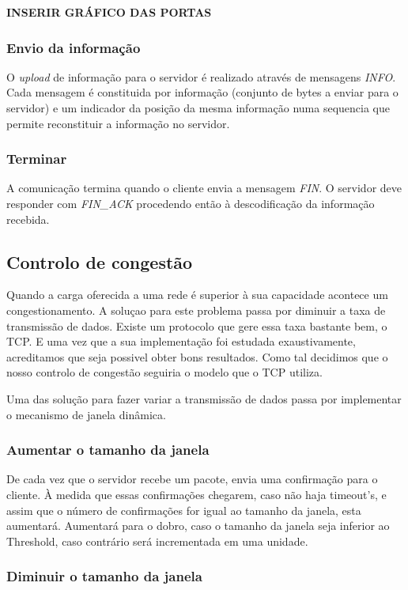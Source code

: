 \documentclass{llncs}
\begin{document}
\textbf{INSERIR GRÁFICO DAS PORTAS}


\subsubsection{Envio da informação}
O \textit{upload} de informação para o servidor é realizado através de mensagens \textit{INFO}. Cada mensagem é constituida por informação (conjunto de bytes a enviar para o servidor) e um indicador da posição da mesma informação numa sequencia que permite reconstituir a informação no servidor.

\subsubsection{Terminar}
A comunicação termina quando o cliente envia a mensagem \textit{FIN}. O servidor deve responder com \textit{FIN\_ACK} procedendo então à descodificação da informação recebida.

\subsection{Controlo de congestão}

Quando a carga oferecida a uma rede é superior à sua capacidade acontece um congestionamento. A soluçao para este problema passa por diminuir a taxa de transmissão de dados.
Existe um protocolo que gere essa taxa bastante bem, o TCP. E uma vez que a sua implementação foi estudada exaustivamente, acreditamos que seja possivel obter bons resultados. Como tal decidimos que o nosso controlo de congestão seguiria o modelo que o TCP utiliza.

Uma das solução para fazer variar a transmissão de dados passa por implementar o mecanismo de janela dinâmica.

\subsubsection{Aumentar o tamanho da janela}

De cada vez que o servidor recebe um pacote, envia uma confirmação para o cliente. À medida que essas confirmações chegarem, caso não haja timeout’s, e assim que o número de confirmações for igual ao tamanho da janela, esta aumentará.
Aumentará para o dobro, caso o tamanho da janela seja inferior ao Threshold, caso contrário será incrementada em uma unidade.

\subsubsection{Diminuir o tamanho da janela}
\end{document}
